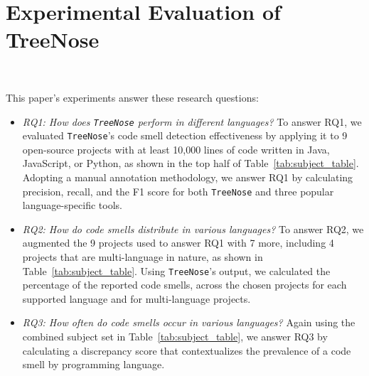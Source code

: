 \section{Experimental Evaluation of TreeNose}~\label{sec:evaluation}

\vspace*{-1em}


\noindent
This paper's experiments answer these research questions:

\begin{itemize}[leftmargin=*]

    \item {\it RQ1: How does \texttt{TreeNose} perform in different languages?}
        To answer RQ1, we evaluated \texttt{TreeNose}'s code smell detection
        effectiveness by applying it to 9 open-source projects with at least
        10,000 lines of code written in Java, JavaScript, or Python, as shown in
        the top half of Table~\ref{tab:subject_table}. Adopting a manual
        annotation methodology, we answer RQ1 by calculating precision, recall,
        and the F1 score for both \texttt{TreeNose} and three popular
        language-specific tools.

    \item {\it RQ2: How do code smells distribute in various languages?} To
        answer RQ2, we augmented the 9 projects used to answer RQ1 with 7 more,
        including 4 projects that are multi-language in nature, as shown in
        Table~\ref{tab:subject_table}. Using \texttt{TreeNose}'s output, we
        calculated the percentage of the reported code smells, across the chosen
        projects for each supported language and for multi-language projects.

    \item {\it RQ3: How often do code smells occur in various languages?}
        Again using the combined subject set in Table~\ref{tab:subject_table},
        we answer RQ3 by calculating a discrepancy score that contextualizes the
        prevalence of a code smell by programming language.

\end{itemize}



